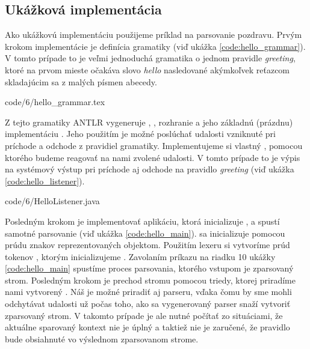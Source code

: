 \subsection{Ukážková implementácia}\label{basic_implementation}
Ako ukážkovú implementáciu použijeme príklad na parsovanie pozdravu. Prvým krokom implementácie je definícia gramatiky (viď ukážka \ref{code:hello_grammar}). V tomto prípade to je veľmi jednoduchá gramatika o jednom pravidle \textit{greeting}, ktoré na prvom mieste očakáva slovo \textit{hello} nasledované akýmkoľvek reťazcom skladajúcim sa z malých písmen abecedy.


            {code/6/hello_grammar.tex}

Z tejto gramatiky ANTLR vygeneruje , , rozhranie  a jeho základnú (prázdnu) implementáciu . Jeho použitím je možné poslúchať udalosti vzniknuté pri príchode a odchode z pravidiel gramatiky. Implementujeme si vlastný , pomocou ktorého budeme reagovať na nami zvolené udalosti. V tomto prípade to je výpis na systémový výstup pri príchode aj odchode na pravidlo \textit{greeting} (viď ukážka \ref{code:hello_listener}).


            {code/6/HelloListener.java}

Posledným krokom je implementovať aplikáciu, ktorá inicializuje ,  a spustí samotné parsovanie (viď ukážka \ref{code:hello_main}).  sa inicializuje pomocou prúdu znakov reprezentovaných  objektom. Použitím lexeru si vytvoríme prúd tokenov , ktorým inicializujeme . Zavolaním príkazu na riadku 10 ukážky \ref{code:hello_main} spustíme proces parsovania, ktorého vstupom je zparsovaný strom. Posledným krokom je prechod stromu pomocou  triedy, ktorej priradíme nami vytvorený . Náš  je možné priradiť aj parseru, vďaka čomu by sme mohli odchytávat udalosti už počas toho, ako sa vygenerovaný parser snaží vytvoriť zparsovaný strom. V takomto prípade je ale nutné počítať zo situáciami, že aktuálne sparovaný kontext nie je úplný a taktiež nie je zaručené, že pravidlo bude obsiahnuté vo výslednom zparsovanom strome. 

